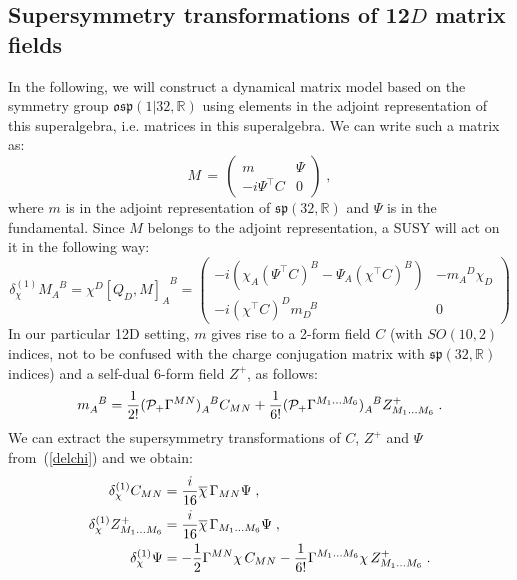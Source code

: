 \documentclass[a4paper,11pt]{article}
\begin{document}
\subsection{Supersymmetry transformations of 12$D$ matrix fields}
In the following, we will construct a dynamical matrix model based on the symmetry group
$\mathfrak{osp}(1|32,\mathbb{R})$ using elements in the adjoint representation of
this superalgebra, i.e. matrices in this superalgebra. We can write such a matrix
as:
\begin{equation}
M\,=\,
\begin{pmatrix}
m & \Psi \\
-i \Psi^{\top} C & 0 
\end{pmatrix}\;,
\end{equation} 
where $m$ is in the adjoint representation of
$\mathfrak{sp}(32,\mathbb{R})$ and $\Psi$ is in the fundamental.
Since $M$ belongs to the adjoint representation, a SUSY will act on it
in the following way: 
\begin{equation}\label{delchi}
\delta^{(1)}_{\chi} M_A^{\phantom{A} B} = \chi^D [Q_D,M]_A^{\phantom{A} B} = 
\begin{pmatrix}
-i(\chi_A (\Psi^{\top} C)^B - \Psi_A (\chi^{\top} C)^B) & - m_A^{\phantom{A}D} \chi_D \\
-i (\chi^{\top} C)^D m_D^{\phantom{C}B} & 0
\end{pmatrix}
\end{equation}
In our particular 12D setting, $m$ gives rise to a 2-form field $C$ (with $SO(10,2)$ indices, 
not to be confused with the charge conjugation matrix with $\mathfrak{sp}(32,\mathbb{R})$ indices) 
and a self-dual 6-form field $Z^+$, as follows:
\begin{equation}\label{m12}
m_A^{\phantom{A}B} = 
\frac{1}{2!} ({\cal P}_+ \Gamma^{MN})_A^{\phantom{A}B} C_{MN} + 
\frac{1}{6!} ({\cal P}_+ \Gamma^{M_1 \ldots M_6})_A^{\phantom{A}B} Z^+_{M_1 \ldots M_6}\;.
\end{equation}
We can extract the supersymmetry transformations of $C$, $Z^+$ and $\Psi$ from~(\ref{delchi}) and we obtain:
\begin{align}\label{del6}
\delta_{\chi}^{(1)} C_{MN} &= \frac{i}{16} \overline{\chi}\,\Gamma_{MN} \Psi \;,\notag\\
\delta_{\chi}^{(1)} Z^+_{M_1 \ldots M_6} &= \frac{i}{16} \overline{\chi}\,\Gamma_{M_1 \ldots M_6} \Psi  \;,\\
\delta_{\chi}^{(1)} \Psi &= - \frac{1}{2}\Gamma^{MN} \chi\, C_{MN} -
\frac{1}{6!}\Gamma^{M_1 \ldots M_6} \chi\, Z^+_{M_1 \ldots M_6} \;.\notag
\end{align}
\end{document}
